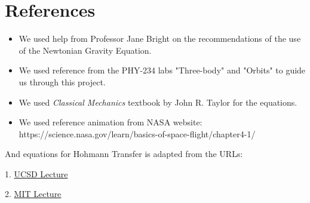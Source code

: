 \documentclass[12pt,a4paper,twocolumn,twoside]{tau-class/tau}
\begin{document}
\section{References}
\begin{itemize}

\item We used help from Professor Jane Bright on the recommendations of the use of the Newtonian Gravity Equation.

\item We used reference from the PHY-234 labs "Three-body" and "Orbits" to guide us through this project. 

\item We used \textit{Classical Mechanics} textbook by John R. Taylor for the equations.

\item We used reference animation from NASA website: https://science.nasa.gov/learn/basics-of-space-flight/chapter4-1/
\end{itemize}

And equations for Hohmann Transfer is adapted from the URLs: 

1. \href{https://courses.physics.ucsd.edu/2019/Winter/physics141/Assignments/Hohmann1.pdf} {UCSD Lecture} 

2. \href{https://dspace.mit.edu/bitstream/handle/1721.1/60691/16-07-fall-2004/contents/lecture-notes/d30.pdf} {MIT Lecture}


\printbibliography

\end{document}
